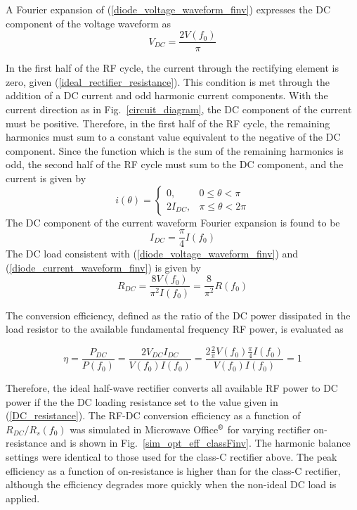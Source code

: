\documentclass[journal]{IEEEtran}
\begin{document}
A Fourier expansion of (\ref{diode_voltage_waveform_finv}) expresses the DC component of the voltage waveform as
\begin{equation}\label{DC_diode_voltage}
    V_{DC} = \frac{2V(f_0)}{\pi}
\end{equation}

In the first half of the RF cycle, the current through the rectifying element is zero, given (\ref{ideal_rectifier_resistance}). This condition is met through the addition of a DC current and odd harmonic current components. With the current direction as in Fig.~\ref{circuit_diagram}, the DC component of the current must be positive.  Therefore, in the first half of the RF cycle, the remaining harmonics must sum to a constant value equivalent to the negative of the DC component.  Since the function which is the sum of the remaining harmonics is odd, the second half of the RF cycle must sum to the DC component, and the current is given by
\begin{equation}\label{diode_current_waveform_finv}
i(\theta) =
\begin{cases}
    0, & 0 \leq \theta < \pi\\
    2I_{DC}, & \pi \leq \theta < 2\pi
\end{cases}
\end{equation}
The DC component of the current waveform Fourier expansion is found to be
\begin{equation}\label{DC_diode_current}
    I_{DC} = \frac{\pi}{4}I(f_0)
\end{equation}
The DC load consistent with (\ref{diode_voltage_waveform_finv}) and (\ref{diode_current_waveform_finv}) is given by
\begin{equation}\label{DC_resistance}
    R_{DC} = \frac{8V(f_0)}{\pi^2I(f_0)} = \frac{8}{\pi^2}R(f_0)
\end{equation}

The conversion efficiency, defined as the ratio of the DC power dissipated in the load resistor to the available fundamental frequency RF power, is evaluated as

\begin{equation}\label{eff_finv}
    \eta = \frac{P_{DC}}{P(f_0)} = \frac{2V_{DC}I_{DC}}{V(f_0)I(f_0)} = \frac{2\frac{2}{\pi}V(f_0)\frac{\pi}{4}I(f_0)}{V(f_0)I(f_0)} = 1
\end{equation}

Therefore, the ideal half-wave rectifier converts all available RF power to DC power if the the DC loading resistance set to the value given in (\ref{DC_resistance}). The RF-DC conversion efficiency as a function of $R_{DC} / R_s(f_0)$ was simulated in Microwave Office$\textsuperscript{\textregistered}$ for varying rectifier on-resistance and is shown in Fig.~\ref{sim_opt_eff_classFinv}. The harmonic balance settings were identical to those used for the class-C rectifier above. The peak efficiency as a function of on-resistance is higher than for the class-C rectifier, although the efficiency degrades more quickly when the non-ideal DC load is applied.
\end{document}
